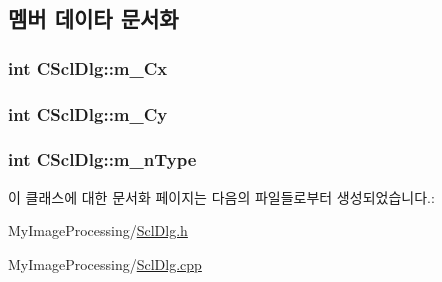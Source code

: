 \subsection{멤버 데이타 문서화}
\hypertarget{class_c_scl_dlg_ae24bfb6ef6de4cb6cbc6f3b6cdae619b}{
\subsubsection[{m\-\_\-\-Cx}]{\setlength{\rightskip}{0pt plus 5cm}int C\-Scl\-Dlg\-::m\-\_\-\-Cx}}\label{class_c_scl_dlg_ae24bfb6ef6de4cb6cbc6f3b6cdae619b}
\hypertarget{class_c_scl_dlg_a6864c7ad7a17b92a9c9e670a871cf9d9}{
\subsubsection[{m\-\_\-\-Cy}]{\setlength{\rightskip}{0pt plus 5cm}int C\-Scl\-Dlg\-::m\-\_\-\-Cy}}\label{class_c_scl_dlg_a6864c7ad7a17b92a9c9e670a871cf9d9}
\hypertarget{class_c_scl_dlg_aa52708335531c455850915172bff26ba}{
\subsubsection[{m\-\_\-n\-Type}]{\setlength{\rightskip}{0pt plus 5cm}int C\-Scl\-Dlg\-::m\-\_\-n\-Type}}\label{class_c_scl_dlg_aa52708335531c455850915172bff26ba}


이 클래스에 대한 문서화 페이지는 다음의 파일들로부터 생성되었습니다.\-:\begin{DoxyCompactItemize}
\item 
My\-Image\-Processing/\hyperlink{_scl_dlg_8h}{Scl\-Dlg.\-h}\item 
My\-Image\-Processing/\hyperlink{_scl_dlg_8cpp}{Scl\-Dlg.\-cpp}\end{DoxyCompactItemize}
